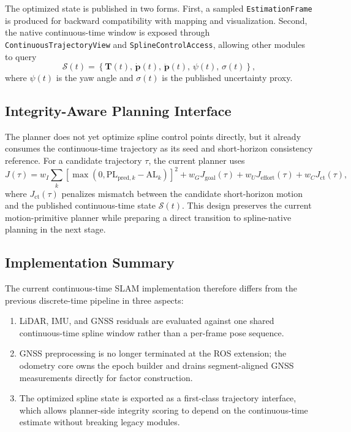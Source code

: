 \documentclass[journal]{IEEEtran}
\begin{document}
The optimized state is published in two forms. First, a sampled
\texttt{EstimationFrame} is produced for backward compatibility with mapping and
visualization. Second, the native continuous-time window is exposed through
\texttt{ContinuousTrajectoryView} and \texttt{SplineControlAccess}, allowing
other modules to query
\begin{equation}
\mathcal{S}(t) =
\left\{
\mathbf{T}(t),\,
\dot{\mathbf{p}}(t),\,
\ddot{\mathbf{p}}(t),\,
\psi(t),\,
\sigma(t)
\right\},
\label{eq:trajectory_sample}
\end{equation}
where $\psi(t)$ is the yaw angle and $\sigma(t)$ is the published uncertainty
proxy.

\subsection{Integrity-Aware Planning Interface}
\label{sec:planner_interface}

The planner does not yet optimize spline control points directly, but it already
consumes the continuous-time trajectory as its seed and short-horizon
consistency reference. For a candidate trajectory $\tau$, the current planner
uses
\begin{equation}
J(\tau) =
w_I \sum_{k}
\left[\max\!\left(0,\mathrm{PL}_{\mathrm{pred},k}-\mathrm{AL}_k\right)\right]^2
+ w_G J_{\mathrm{goal}}(\tau)
+ w_U J_{\mathrm{effort}}(\tau)
+ w_C J_{\mathrm{ct}}(\tau),
\label{eq:planner_cost}
\end{equation}
where $J_{\mathrm{ct}}(\tau)$ penalizes mismatch between the candidate
short-horizon motion and the published continuous-time state
$\mathcal{S}(t)$. This design preserves the current motion-primitive planner
while preparing a direct transition to spline-native planning in the next stage.

\subsection{Implementation Summary}
\label{sec:implementation_summary}

The current continuous-time SLAM implementation therefore differs from the
previous discrete-time pipeline in three aspects:
\begin{enumerate}
  \item LiDAR, IMU, and GNSS residuals are evaluated against one shared
        continuous-time spline window rather than a per-frame pose sequence.
  \item GNSS preprocessing is no longer terminated at the ROS extension; the
        odometry core owns the epoch builder and drains segment-aligned GNSS
        measurements directly for factor construction.
  \item The optimized spline state is exported as a first-class trajectory
        interface, which allows planner-side integrity scoring to depend on the
        continuous-time estimate without breaking legacy modules.
\end{enumerate}
\end{document}
